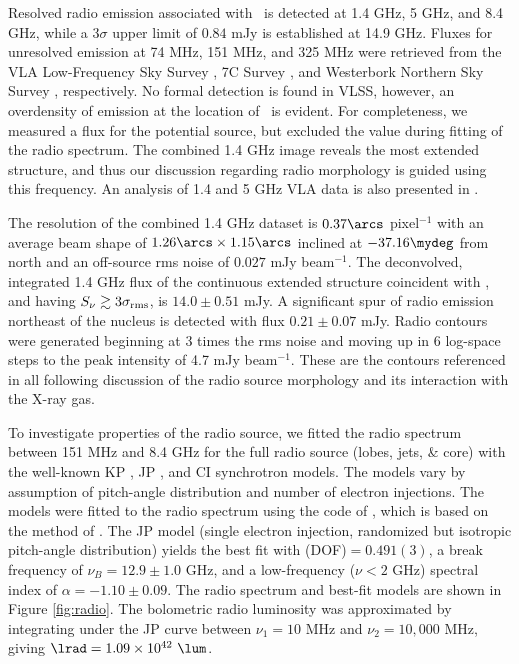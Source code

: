 \documentclass[useAMS,usenatbib]{mn2e}
\begin{document}
Resolved radio emission associated with \irs\ is detected at 1.4 GHz,
5 GHz, and 8.4 GHz, while a $3\sigma$ upper limit of $0.84$ mJy is
established at 14.9 GHz. Fluxes for unresolved emission at 74 MHz, 151
MHz, and 325 MHz were retrieved from the VLA Low-Frequency Sky Survey
\citep[VLSS;][]{vlss}, 7C Survey \citep{1999MNRAS.306...31R}, and
Westerbork Northern Sky Survey \citep[WENSS;][]{1997A&AS..124..259R},
respectively. No formal detection is found in VLSS, however, an
overdensity of emission at the location of \irs\ is evident. For
completeness, we measured a flux for the potential source, but
excluded the value during fitting of the radio spectrum. The combined
1.4 GHz image reveals the most extended structure, and thus our
discussion regarding radio morphology is guided using this
frequency. An analysis of 1.4 and 5 GHz VLA data is also presented in
\citet[][hereafter H93]{1993ApJ...415...82H}.

The resolution of the combined 1.4 GHz dataset is $0.37\arcs$
pixel$^{-1}$ with an average beam shape of $1.26\arcs \times
1.15\arcs$ inclined at $-37.16\mydeg$ from north and an off-source rms
noise of $0.027$ mJy beam$^{-1}$. The deconvolved, integrated 1.4 GHz
flux of the continuous extended structure coincident with \irs, and
having $S_{\nu} \gtrsim 3\sigma_{\mathrm{rms}}$, is $14.0 \pm 0.51$ mJy. A
significant spur of radio emission northeast of the nucleus is
detected with flux $0.21 \pm 0.07$ mJy. Radio contours were generated
beginning at 3 times the rms noise and moving up in 6 log-space steps
to the peak intensity of 4.7 mJy beam$^{-1}$. These are the contours
referenced in all following discussion of the radio source morphology
and its interaction with the X-ray gas.

To investigate properties of the radio source, we fitted the radio
spectrum between 151 MHz and 8.4 GHz for the full radio source (lobes,
jets, \& core) with the well-known KP \citep{1962SvA.....6..317K,
  pach}, JP \citep{1973A&A....26..423J}, and CI
\citep{1987MNRAS.225..335H} synchrotron models. The models vary by
assumption of pitch-angle distribution and number of electron
injections. The models were fitted to the radio spectrum using the
code of \citet{2005ApJ...624..656W}, which is based on the method of
\citet{1991ApJ...383..554C}. The JP model (single electron injection,
randomized but isotropic pitch-angle distribution) yields the best fit
with \chisq(DOF)$ = 0.491(3)$, a break frequency of $\nu_B = 12.9 \pm
1.0$ GHz, and a low-frequency ($\nu < 2$ GHz) spectral index of
$\alpha = -1.10 \pm 0.09$. The radio spectrum and best-fit models are
shown in Figure \ref{fig:radio}. The bolometric radio luminosity was
approximated by integrating under the JP curve between $\nu_1 = 10$
MHz and $\nu_2 = 10,000$ MHz, giving $\lrad = 1.09\times10^{42}~\lum$.
\end{document}

